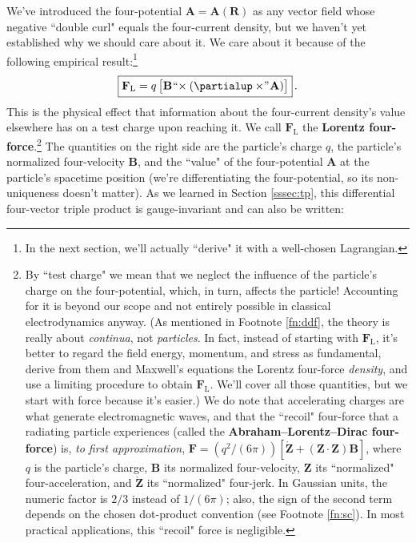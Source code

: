 \documentclass[12pt]{article}
\renewcommand{\vv}[1]{\mathbf{#1}}
\begin{document}
We've introduced the four-potential $\vv A = \vv A (\vv R)$ as any vector field whose negative ``double curl" equals the four-current density, but we haven't yet established why we should care about it. We care about it because of the following empirical result:\footnote{In the next section, we'll actually ``derive" it with a well-chosen Lagrangian.}
\begin{equation}\label{eq:ff}
\boxed{\vv F_{\textrm{L}} = q \, \bigl[ \vv B \mkern1mu `` \mkern-4mu \times (\partialup \times \mkern-4mu " \mkern1mu \vv A) \bigr]} \, .
\end{equation}
This is the physical effect that information about the four-current density's value elsewhere has on a test charge upon reaching it. We call $\vv F_{\textrm{L}}$ the \textbf{Lorentz four-force}.\footnote{\label{fn:recoil}By ``test charge" we mean that we neglect the influence of the particle's charge on the four-potential, which, in turn, affects the particle! Accounting for it is beyond our scope and not entirely possible in classical electrodynamics anyway. (As mentioned in Footnote \ref{fn:ddf}, the theory is really about \emph{continua}, not \emph{particles}. In fact, instead of starting with $\vv F_{\textrm{L}}$, it's better to regard the field energy, momentum, and stress as fundamental, derive from them and Maxwell's equations the Lorentz four-force \emph{density}, and use a limiting procedure to obtain $\vv F_{\textrm{L}}$. We'll cover all those quantities, but we start with force because it's easier.) We do note that accelerating charges are what generate electromagnetic waves, and that the ``recoil" four-force that a radiating particle experiences (called the \textbf{Abraham--Lorentz--Dirac four-force}) is, \emph{to first approximation}, $\vv F = (q^2 / (6 \pi))[\mathring{\vv Z} + (\vv Z \cdot \vv Z) \vv B]$, where $q$ is the particle's charge, $\vv B$ its normalized four-velocity, $\vv Z$ its ``normalized" four-acceleration, and $\mathring{\vv Z}$ its ``normalized" four-jerk. In Gaussian units, the numeric factor is $2/3$ instead of $1/(6 \pi)$; also, the sign of the second term depends on the chosen dot-product convention (see Footnote \ref{fn:sc}). In most practical applications, this ``recoil" force is negligible.} The quantities on the right side are the particle's charge $q$, the particle's normalized four-velocity $\vv B$, and the ``value" of the four-potential $\vv A$ at the particle's spacetime position (we're differentiating the four-potential, so its non-uniqueness doesn't matter). As we learned in Section \ref{sssec:tp}, this differential four-vector triple product is gauge-invariant and can also be written:
\end{document}
